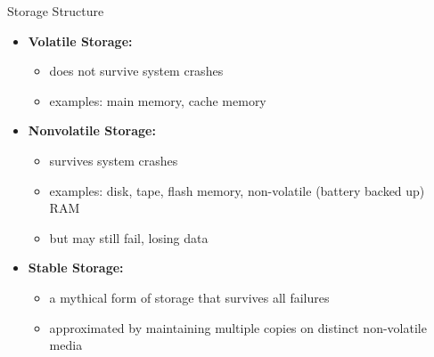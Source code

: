\documentclass[aspectratio=169, xcolor=dvipsnames]{beamer}
\begin{document}
\begin{frame}{Storage Structure}
    \begin{itemize}[<+->]
        \item \textbf{Volatile Storage:}
        \begin{itemize}
            \item[$\triangleright$] does not survive system crashes
            \item[$\triangleright$] examples: main memory, cache memory
        \end{itemize}
        \item \textbf{Nonvolatile Storage:}
        \begin{itemize}
            \item[$\triangleright$] survives system crashes
            \item[$\triangleright$] examples: disk, tape, flash memory, non-volatile (battery backed up) RAM
            \item[$\triangleright$] but may still fail, losing data
        \end{itemize}
        \item \textbf{Stable Storage:}
        \begin{itemize}
            \item[$\triangleright$] a mythical form of storage that survives all failures
            \item[$\triangleright$] approximated by maintaining multiple copies on distinct non-volatile media
        \end{itemize}
    \end{itemize}
\end{frame}
\end{document}
